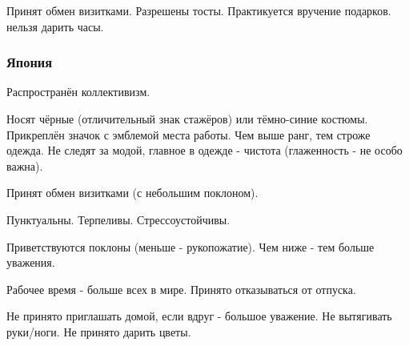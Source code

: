 \documentclass[a4paper,14pt]{extarticle}
\begin{document}
Принят обмен визитками. Разрешены тосты. Практикуется вручение
подарков. нельзя дарить часы.

\subsubsection{Япония}

Распространён коллективизм.

Носят чёрные (отличительный знак стажёров) или тёмно-синие костюмы. Прикреплён значок с эмблемой места работы. Чем выше ранг, тем строже одежда. Не следят за модой, главное в одежде - чистота (глаженность - не особо важна).

Принят обмен визитками (с небольшим поклоном).

Пунктуальны. Терпеливы. Стрессоустойчивы.

Приветствуются поклоны (меньше - рукопожатие). Чем ниже - тем больше уважения.

Рабочее время - больше всех в мире. Принято отказываться от отпуска.

Не принято приглашать домой, если вдруг - большое уважение. Не вытягивать руки/ноги. Не принято дарить цветы.
\end{document}
